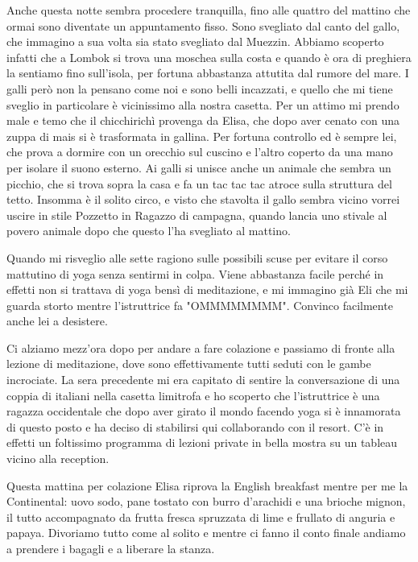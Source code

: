 Anche questa notte sembra procedere tranquilla, fino alle quattro del mattino che ormai sono diventate un appuntamento fisso. Sono svegliato dal canto del gallo, che immagino a sua volta sia stato svegliato dal Muezzin. Abbiamo scoperto infatti che a Lombok si trova una moschea sulla costa e quando è ora di preghiera la sentiamo fino sull'isola, per fortuna abbastanza attutita dal rumore del mare. I galli però non la pensano come noi e sono belli incazzati, e quello che mi tiene sveglio in particolare è vicinissimo alla nostra casetta. Per un attimo mi prendo male e temo che il chicchirichì provenga da Elisa, che dopo aver cenato con una zuppa di mais si è trasformata in gallina. Per fortuna controllo ed è sempre lei, che prova a dormire con un orecchio sul cuscino e l'altro coperto da una mano per isolare il suono esterno. Ai galli si unisce anche un animale che sembra un picchio, che si trova sopra la casa e fa un tac tac tac atroce sulla struttura del tetto. Insomma è il solito circo, e visto che stavolta il gallo sembra vicino vorrei uscire in stile Pozzetto in Ragazzo di campagna, quando lancia uno stivale al povero animale dopo che questo l'ha svegliato al mattino.

Quando mi risveglio alle sette ragiono sulle possibili scuse per evitare il corso mattutino di yoga senza sentirmi in colpa. Viene abbastanza facile perché in effetti non si trattava di yoga bensì di meditazione, e mi immagino già Eli che mi guarda storto mentre l'istruttrice fa "OMMMMMMMM". Convinco facilmente anche lei a desistere.

Ci alziamo mezz'ora dopo per andare a fare colazione e passiamo di fronte alla lezione di meditazione, dove sono effettivamente tutti seduti con le gambe incrociate. La sera precedente mi era capitato di sentire la conversazione di una coppia di italiani nella casetta limitrofa e ho scoperto che l'istruttrice è una ragazza occidentale che dopo aver girato il mondo facendo yoga si è innamorata di questo posto e ha deciso di stabilirsi qui collaborando con il resort. C'è in effetti un foltissimo programma di lezioni private in bella mostra su un tableau vicino alla reception.

Questa mattina per colazione Elisa riprova la English breakfast mentre per me la Continental: uovo sodo, pane tostato con burro d'arachidi e una brioche mignon, il tutto accompagnato da frutta fresca spruzzata di lime e frullato di anguria e papaya. Divoriamo tutto come al solito e mentre ci fanno il conto finale andiamo a prendere i bagagli e a liberare la stanza.

